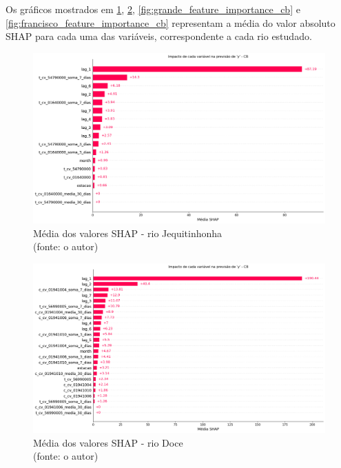 
Os gráficos mostrados em \ref{fig:jequiti_feature_importance_cb}, \ref{fig:doce_feature_importance_cb}, \ref{fig:grande_feature_importance_cb} e \ref{fig:francisco_feature_importance_cb} representam a média do valor absoluto SHAP para cada uma das variáveis, correspondente a cada rio estudado.

\begin{figure}[!h]
\centering
\includegraphics[scale=0.33]{Figuras/jequiti/wfv/feature_importance/feature_importance_cb.png}
\caption{Média dos valores SHAP - rio Jequitinhonha\\(fonte: o autor)}
\label{fig:jequiti_feature_importance_cb}
\end{figure}

\begin{figure}[!h]
\centering
\includegraphics[scale=0.33]{Figuras/rio_doce/wfv/feature_importance/feature_importance_cb.png}
\caption{Média dos valores SHAP - rio Doce\\(fonte: o autor)}
\label{fig:doce_feature_importance_cb}
\end{figure}

